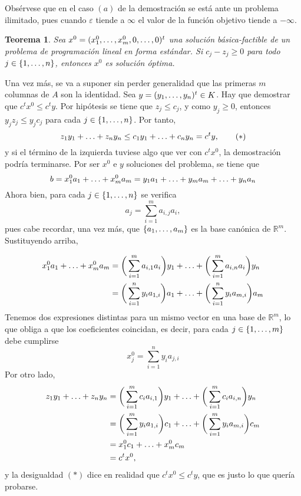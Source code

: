 \documentclass[11pt]{report}
\makeatletter
\renewenvironment{proof}[1][\proofname]{\par
  \pushQED{\qed}%
  \normalfont \topsep\z@skip %
  \trivlist
  \item[\hskip\labelsep
        \itshape
    #1\@addpunct{.}]\ignorespaces
}{%
  \popQED\endtrivlist\@endpefalse
}
\theoremstyle{mytheorem}
\newtheorem{theorem}{Teorema}
\theoremstyle{mydefinition}
\theoremstyle{myexample}
\let\oldproofname=\proofname
\renewcommand{\proofname}{\rm\bf{\oldproofname}}}
\newenvironment{ctheorem} %
  {\begin{mdframed}[
        linewidth=3pt,
        linecolor=c2,
        bottomline=false,
        topline=false,
        rightline=false,
        innerrightmargin=0pt,
        innertopmargin=0pt,
        innerbottommargin=0pt,
        innerleftmargin=1em,
        skipabove=\baselineskip]
    \begin{theorem}}
  {\end{theorem}\end{mdframed}}
\newcommand{\R}{\mathbb R}
\makeatother
\begin{document}
\begin{proof}
Obsérvese que en el caso $(a)$ de la demostración se está ante un problema ilimitado, pues cuando $\varepsilon$ tiende a $\infty$ el valor de la función objetivo tiende a $-\infty$.
\end{proof}

\begin{ctheorem}
\label{teo2.2.}
Sea $x^0 = (x^0_1,\mathellipsis,x_m^0,0,\mathellipsis,0)^t$ una solución básica-factible de un problema de programación lineal en forma estándar. Si $c_j-z_j \geq 0$ para todo $j \in \{1,\mathellipsis,n\}$, entonces $x^0$ es solución óptima.
\end{ctheorem}

\begin{proof}
Una vez más, se va a suponer sin perder generalidad que las primeras $m$ columnas de $A$ son la identidad. Sea $y = (y_1,\mathellipsis,y_n)^t \in K$. Hay que demostrar que $c^tx^0 \leq c^ty$. Por hipótesis se tiene que $z_j \leq c_j$, y como $y_j \geq 0$, entonces $y_jz_j \leq y_jc_j$ para cada $j \in \{1,\mathellipsis,n\}$. Por tanto,
\[z_1y_1+\mathellipsis+z_ny_n \leq c_1y_1+\mathellipsis+c_ny_n = c^ty, \tag{$\ast$}\]
y si el término de la izquierda tuviese algo que ver con $c^tx^0$, la demostración podría terminarse. Por ser $x^0$ e $y$ soluciones del problema, se tiene que
\[b = x^0_1a_1+\mathellipsis+x^0_ma_m = y_1a_1+\mathellipsis+y_ma_m+\mathellipsis+y_na_n\]
Ahora bien, para cada $j \in \{1,\mathellipsis,n\}$ se verifica
\[a_j = \sum_{i=1}^m a_{i,j}a_i,\]
pues cabe recordar, una vez más, que $\{a_1,\mathellipsis,a_m\}$ es la base canónica de $\R^m$. Sustituyendo arriba,

\[
\begin{aligned}[t]
    x^0_1a_1+\mathellipsis+x^0_ma_m &= \biggl( \, \sum_{i=1}^m a_{i,1}a_i\biggr)y_1 + \mathellipsis+ \biggl( \, \sum_{i=1}^m a_{i,n}a_i \biggr)y_n \\
    &= \biggl( \, \sum_{i=1}^n y_ia_{1,i}\biggr)a_1+\mathellipsis+\biggl(\, \sum_{i=1}^n y_ia_{m,i}\biggr) a_m
\end{aligned}
\]
Tenemos dos expresiones distintas para un mismo vector en una base de $\R^m$, lo que obliga a que los coeficientes coincidan, es decir, para cada $j \in \{1,\mathellipsis,m\}$ debe cumplirse
\[x^0_j = \sum_{i=1}^n y_ia_{j,i}\]
Por otro lado,
\[
\begin{aligned}[t]
z_1y_1+\mathellipsis+z_ny_n &= \biggl(\, \sum_{i=1}^m c_ia_{i,1}\biggr)y_1+\mathellipsis+\biggl(\, \sum_{i=1}^m c_ia_{i,n}\biggr)y_n \\
&= \biggl(\, \sum_{i=1}^m y_ia_{1,i}\biggr)c_1+\mathellipsis+\biggl(\, \sum_{i=1}^m y_ia_{m,i}\biggr)c_m \\
&= x^0_1 c_1+\mathellipsis+x^0_mc_m \\
&= c^tx^0,
\end{aligned}
\]
y la desigualdad $(\ast)$ dice en realidad que $c^tx^0 \leq c^ty$, que es justo lo que quería probarse.
\end{proof}
\end{document}

